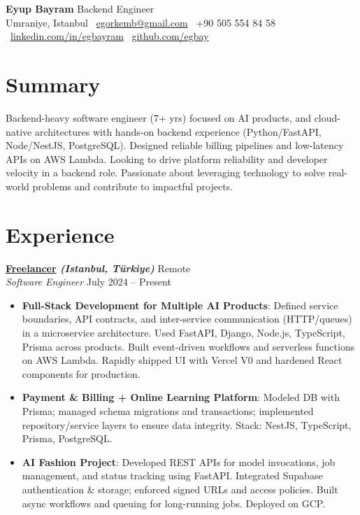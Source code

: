 \documentclass[10pt,a4paper]{extarticle}
\begin{document}
\begin{center}
  \begin{minipage}{\textwidth}
    \centering
    {\LARGE\textbf{Eyup Bayram}} \hspace{2pt} {\LARGE Backend Engineer}\\[8pt]
    Umraniye, Istanbul \textbullet\ 
    \href{mailto:egorkemb@gmail.com}{egorkemb@gmail.com} \textbullet\
    +90 505 554 84 58 \textbullet\
    \href{https://linkedin.com/in/egbayram}{linkedin.com/in/egbayram} \textbullet\
    \href{https://github.com/egbay}{github.com/egbay}
  \end{minipage}
\end{center}

\section{Summary}
Backend-heavy software engineer (7+ yrs) focused on AI products, and cloud-native architectures with hands-on backend experience (Python/FastAPI, Node/NestJS, PostgreSQL). Designed reliable billing pipelines and low-latency APIs on AWS Lambda. Looking to drive platform reliability and developer velocity in a backend role. Passionate about leveraging technology to solve real-world problems and contribute to impactful projects. 

\section{Experience}
\textbf{\href{https://linkedin.com/in/egbayram}{Freelancer} \textit{(Istanbul, Türkiye)}} \hfill Remote\\
\textit{Software Engineer} \hfill July 2024 -- Present
\begin{itemize}[leftmargin=*,noitemsep,topsep=0pt]
    \item \textbf{Full-Stack Development for Multiple AI Products}: Defined service boundaries, API contracts, and inter-service communication (HTTP/queues) in a microservice architecture. Used FastAPI, Django, Node.js, TypeScript, Prisma across products. Built event-driven workflows and serverless functions on AWS Lambda. Rapidly shipped UI with Vercel V0 and hardened React components for production.
    \item \textbf{Payment \& Billing + Online Learning Platform}: Modeled DB with Prisma; managed schema migrations and transactions; implemented repository/service layers to ensure data integrity. Stack: NestJS, TypeScript, Prisma, PostgreSQL.
    \item \textbf{AI Fashion Project}: Developed REST APIs for model invocations, job management, and status tracking using FastAPI. Integrated Supabase authentication \& storage; enforced signed URLs and access policies. Built async workflows and queuing for long-running jobs. Deployed on GCP.
\end{itemize}
\end{document}
